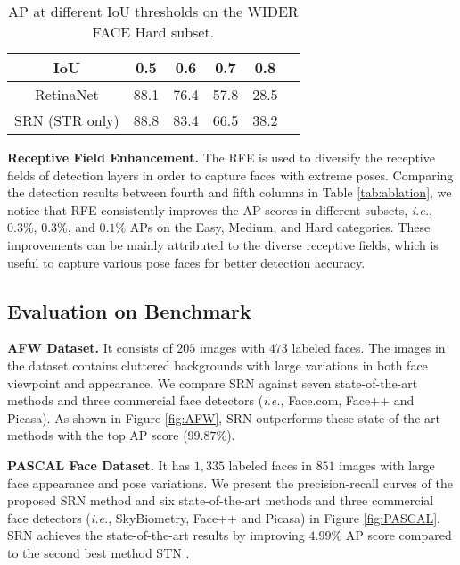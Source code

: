 \documentclass[letterpaper]{article} \usepackage{aaai19m}  \usepackage{times}  \usepackage{helvet}  \usepackage{courier}  \usepackage{url}  \usepackage{graphicx}  \usepackage{subfigure}
\def\ie{{\em i.e.}}
\begin{document}
\begin{table}[h]
\centering
\caption{AP at different IoU thresholds on the WIDER FACE Hard subset.}
\setlength{\tabcolsep}{10.5pt}
\begin{tabular}{c|ccccc}
\toprule[1.5pt]
IoU & 0.5 & 0.6 & 0.7 & 0.8 \\
\hline
{RetinaNet} & 88.1 & 76.4 & 57.8 & 28.5\\
{SRN (STR only)} & 88.8 & 83.4 & 66.5 & 38.2\\
\bottomrule[1.5pt]
\end{tabular}
\vspace{-0.5mm}
\label{tab:aps}
\end{table}

{\flushleft \textbf{Receptive Field Enhancement.} }
The RFE is used to diversify the receptive fields of detection layers in order to capture faces with extreme poses. Comparing the detection results between fourth and fifth columns in Table \ref{tab:ablation}, we notice that  RFE consistently improves the AP scores in different subsets, \ie, $0.3\%$, $0.3\%$, and $0.1\%$ APs on the Easy, Medium, and Hard categories. These improvements can be mainly attributed to the diverse receptive fields, which is useful to capture various pose faces for better detection accuracy. 




\subsection{Evaluation on Benchmark}
{\flushleft \textbf{AFW Dataset.} }
It consists of $205$ images with $473$ labeled faces. The images in the dataset contains cluttered backgrounds with large variations in both face viewpoint and appearance. We compare SRN against seven state-of-the-art methods and three commercial face detectors (\ie, Face.com, Face++ and Picasa). As shown in Figure \ref{fig:AFW}, SRN outperforms these state-of-the-art methods with the top AP score ($99.87\%$).

{\flushleft \textbf{PASCAL Face Dataset.} }
It has $1,335$ labeled faces in $851$ images with large face appearance and pose variations. We present the precision-recall curves of the proposed SRN method and six state-of-the-art methods and three commercial face detectors (\ie, SkyBiometry, Face++ and Picasa) in Figure \ref{fig:PASCAL}. SRN achieves the state-of-the-art results by improving $4.99\%$ AP score compared to the second best method STN \cite{DBLP:conf/eccv/ChenHW016}.
\end{document}
